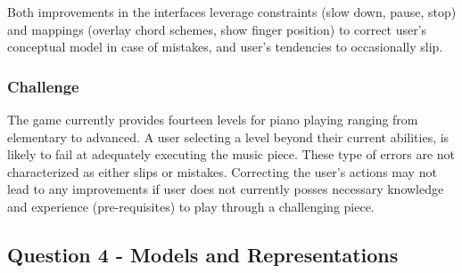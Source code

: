 \documentclass[12pt,letterpaper]{article}
\begin{document}
Both improvements in the interfaces leverage constraints (slow down, pause, stop) and mappings (overlay chord schemes, show finger position) to correct user's conceptual model in case of mistakes, and user's tendencies to occasionally slip.

\subsubsection*{Challenge}
The game currently provides fourteen levels for piano playing ranging from elementary to advanced. A user selecting a level beyond their current abilities, is likely to fail at adequately executing the music piece. These type of errors are not characterized as either slips or mistakes. Correcting the user's actions may not lead to any improvements if user does not currently posses necessary knowledge and experience (pre-requisites) to play through a challenging piece.  

\subsection*{Question 4 - Models and Representations}

 

\end{document}
